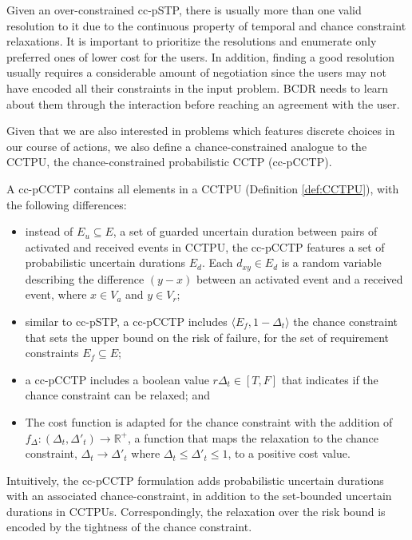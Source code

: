 \documentclass[jair,twoside,11pt,theapa]{article}
\begin{document}
Given an over-constrained cc-pSTP, there is usually more than one valid resolution to it due to
the continuous property of temporal and chance constraint relaxations. It is
important to prioritize the resolutions and enumerate only preferred ones of
lower cost for the users. In addition, finding a good resolution usually
requires a considerable amount of
negotiation since the users may not have encoded all their constraints in the
input problem. BCDR needs to learn about them through the
interaction before reaching an agreement with the user.
	
	
Given that we are also interested in problems which features discrete choices in our course of actions,
we also define a chance-constrained analogue to the CCTPU, the chance-constrained probabilistic CCTP (cc-pCCTP). 

\begin{mydef}
	A cc-pCCTP contains all elements in a CCTPU (Definition \ref{def:CCTPU}), with the following differences:
	
	\begin{itemize}
		\item instead of $E_u\subseteq E$, a set of guarded uncertain duration between pairs of
activated and received events in CCTPU, the cc-pCCTP features a set of probabilistic uncertain durations $E_d$. Each $d_{xy}\in
			E_d$ is a random variable describing the difference $(y-x)$ between an activated 
			event and a received event, where $x\in V_a$ and $y\in V_r$;
		\item similar to cc-pSTP, a cc-pCCTP includes $\langle E_f, 1 - \Delta_t\rangle$ the chance constraint that sets the upper bound on the risk of failure, for the set of requirement constraints $E_f\subseteq E$;
		
		\item a cc-pCCTP includes  a boolean value $r\Delta_t\in [T,F]$  that indicates if the chance constraint can be relaxed; and 
		
		\item 	The cost function is adapted for the chance constraint with the addition of  $f_\Delta:(\Delta_t,\Delta'_t)\rightarrow \mathbb{R}^+$, a function
						that maps the relaxation to the chance constraint, $\Delta_t\rightarrow
						\Delta'_t$ where $\Delta_t\leq \Delta'_t\leq 1$, to a positive cost value.
	\end{itemize}
	
\end{mydef}

Intuitively, the cc-pCCTP formulation adds probabilistic uncertain durations with an associated chance-constraint, in addition to the set-bounded uncertain durations in CCTPUs. Correspondingly, the relaxation over the risk bound is encoded by the tightness of the chance constraint. 
\end{document}
